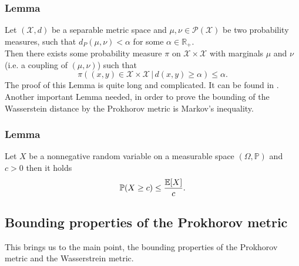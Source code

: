 \documentclass[11pt,a4paper]{article}
\begin{document}
\subsubsection{Lemma}
Let $(\mathcal{X},d)$ be a separable metric space and $\mu,\nu\in\mathcal{P(X)}$ be two probability measures, such that $d_P(\mu,\nu)<\alpha$ for some $\alpha\in\mathbb{R}_{+}$.\vspace{1em}\\ Then there exists some probability measure $\pi$ on $\mathcal{X\times{}X}$ with marginals $\mu$ and $\nu$ (i.e. a coupling of $(\mu,\nu)$) such that 
\[
\pi\left((x,y)\in\mathcal{X\times{}X}\,|\,d(x,y)\geq\alpha\right)\leq\alpha.
\] 
The proof of this Lemma is quite long and complicated. It can be found in \cite{Billingsley}.\vspace{1em}\\
\noindent{}Another important Lemma needed, in order to prove the bounding of the Wasserstein distance by the Prokhorov metric is Markov's inequality.
\subsubsection{Lemma}
Let $X$ be a nonnegative random variable on a measurable space $(\Omega,\mathbb{P})$ and $c>0$ then it holds
\begin{align*}
\mathbb{P}(X\geq{}c)\leq\frac{\mathbb{E}[X]}{c}.\vspace{2em}\\
\end{align*}
\subsection{Bounding properties of the Prokhorov metric}
This brings us to the main point, the bounding properties of the Prokhorov metric and the Wasserstrein metric.
\end{document}
